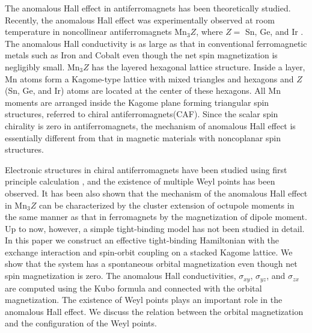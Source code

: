 \documentclass[letter,twocolumn,amsmath,amssymb,superscriptaddress]{jpsj3}
\begin{document}
The anomalous Hall effect in antiferromagnets has been theoretically studied.
\cite{Kleiner1966,
Maranzana1967,
Shindou2001,
Mandal2012,
Chen2014,
Kubler2014,
Sekine2016,
Yang2017,
Suzuki2017} 
Recently, the anomalous Hall effect was experimentally observed at room temperature in noncollinear antiferromagnets Mn$_3Z$, where $Z=$ Sn, Ge, and Ir
\cite{Nakatsuji2015,
Nayak2015,
Kiyohara2016,Li2017}.
The anomalous Hall conductivity is as large as that in conventional ferromagnetic metals such as Iron and Cobalt even though the net spin magnetization is negligibly small\cite{Nakatsuji2015}.
Mn$_3Z$ has the layered hexagonal lattice structure. Inside a layer, Mn atoms form a Kagome-type lattice with mixed triangles and hexagons and $Z$ (Sn, Ge, and Ir) atoms are located at the center of these hexagons. 
All Mn moments are arranged inside the Kagome plane forming triangular spin structures, referred to  chiral antiferromagnets(CAF). 
Since the scalar spin chirality is zero in antiferromagnets, the mechanism of anomalous Hall effect is essentially different from that in magnetic materials with noncoplanar spin structures.

Electronic structures in chiral antiferromagnets have been studied using first principle calculation
\cite{Chen2014,Kubler2014,Yang2017,Suzuki2017} 
, and the existence of multiple Weyl points has been observed\cite{Yang2017}.
It has been also shown that the mechanism of the anomalous Hall effect in Mn$_3Z$ can be characterized by the cluster extension of octupole moments in the same manner as that in ferromagnets by the magnetization of dipole moment\cite{Suzuki2017}.
Up to now, however, a simple tight-binding model has not been studied in detail.
In this paper we construct an effective tight-binding Hamiltonian with the exchange interaction and spin-orbit coupling on a stacked Kagome lattice.
We show that the system has a spontaneous orbital magnetization even though net spin magnetization is zero. The anomalous Hall conductivities, $\sigma_{xy}$, $\sigma_{yz}$, and $\sigma_{zx}$ are computed using the Kubo formula and connected with the orbital magnetization.
The existence of Weyl points plays an important role in the anomalous Hall effect. We discuss the relation between the orbital magnetization and the configuration of the Weyl points.



\end{document}
